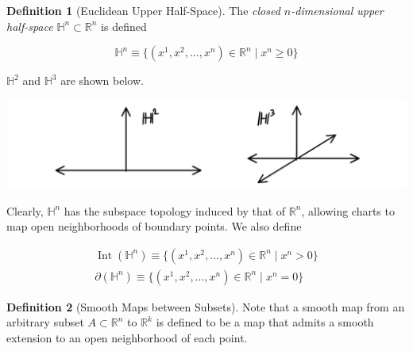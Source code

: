 \documentclass{article}
\DeclareMathOperator{\Int}{Int}
\theoremstyle{remark}
\theoremstyle{definition}
\newtheorem{definition}{Definition}[section]
\begin{document}
    \begin{definition}[Euclidean Upper Half-Space]
      The \textit{closed $n$-dimensional upper half-space} $\mathbb{H}^n \subset \mathbb{R}^n$ is defined

        \[\mathbb{H}^n \equiv \big\{ (x^1, x^2, ..., x^n) \in \mathbb{R}^n \;|\; x^n \geq 0\big\}\]

      $\mathbb{H}^2$ and $\mathbb{H}^3$ are shown below. 

      \begin{center}
        \includegraphics[scale=0.25]{img/Half_Euclidean_Space.PNG}
      \end{center}

      Clearly, $\mathbb{H}^n$ has the subspace topology induced by that of $\mathbb{R}^n$, allowing charts to map open neighborhoods of boundary points. We also define

      \begin{align*}
        \Int(\mathbb{H}^n) \equiv \big\{ (x^1, x^2, ..., x^n) \in \mathbb{R}^n \;|\; x^n > 0\big\} \\
        \partial(\mathbb{H}^n) \equiv \big\{ (x^1, x^2, ..., x^n) \in \mathbb{R}^n \;|\; x^n = 0\big\}
      \end{align*}
    \end{definition}

    \begin{definition}[Smooth Maps between Subsets]
      Note that a smooth map from an arbitrary subset $A \subset \mathbb{R}^n$ to $\mathbb{R}^k$ is defined to be a map that admits a smooth extension to an open neighborhood of each point. 
      \begin{center}
      \end{center}
    \end{definition}
\end{document}
